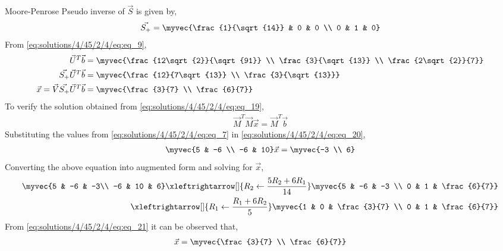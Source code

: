 Moore-Penrose Pseudo inverse of $\vec{S}$ is given by,
\begin{align} \label{eq:solutions/4/45/2/4/eq:eq_18}
    \vec{S_+} = \myvec{\frac{1}{\sqrt{14}} & 0 & 0 \\ 0 & 1 & 0}
\end{align}
From \eqref{eq:solutions/4/45/2/4/eq:eq_9},
\begin{align}
    \vec{U}^T\vec{b} &= \myvec{\frac{12\sqrt{2}}{\sqrt{91}} \\ 
    \frac{3}{\sqrt{13}} \\ \frac{2\sqrt{2}}{7}} \nonumber \\
    \vec{S_+}\vec{U}^T\vec{b} &= \myvec{\frac{12}{7\sqrt{13}} \\ \frac{3}{\sqrt{13}}} \nonumber \\
    \vec{x} = \vec{V}\vec{S_+}\vec{U}^T\vec{b} &= \myvec{\frac{3}{7} \\ \frac{6}{7}} \label{eq:solutions/4/45/2/4/eq:eq_19}
\end{align}
To verify the solution obtained from \eqref{eq:solutions/4/45/2/4/eq:eq_19},
\begin{align} \label{eq:solutions/4/45/2/4/eq:eq_20}
    \vec{M}^T\vec{M}\vec{x} = \vec{M}^T\vec{b}
\end{align}
Substituting the values from \eqref{eq:solutions/4/45/2/4/eq:eq_7} in \eqref{eq:solutions/4/45/2/4/eq:eq_20},
\begin{align}
    \myvec{5 & -6 \\ -6 & 10}\vec{x} = \myvec{-3 \\ 6} \nonumber
\end{align}
Converting the above equation into augmented form and solving for $\vec{x}$,
\begin{align}
    \myvec{5 & -6 & -3\\ -6 & 10 & 6} \xleftrightarrow[]{R_2 \leftarrow \frac{5R_2+6R_1}{14}} \myvec{5 & -6 & -3 \\ 0 & 1 & \frac{6}{7}} \nonumber \\ \xleftrightarrow[]{R_1 \leftarrow \frac{R_1+6R_2}{5}} \myvec{1 & 0 & \frac{3}{7} \\ 0 & 1 & \frac{6}{7}} \label{eq:solutions/4/45/2/4/eq:eq_21}
\end{align}
From \eqref{eq:solutions/4/45/2/4/eq:eq_21} it can be observed that,
\begin{align} \label{eq:solutions/4/45/2/4/eq:eq_22}
    \vec{x} = \myvec{\frac{3}{7} \\ \frac{6}{7}} 
\end{align}
